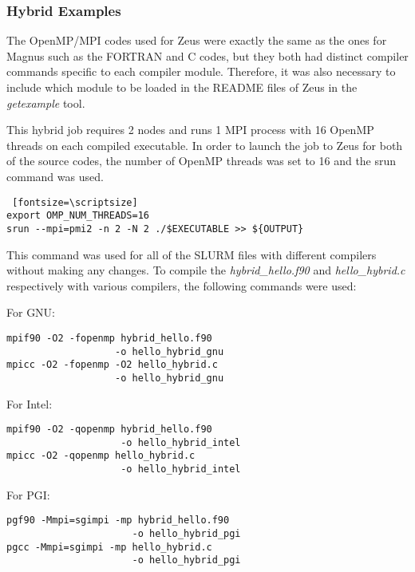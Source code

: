 \subsubsection{Hybrid Examples}

The OpenMP/MPI codes used for Zeus were exactly the same as the ones for Magnus such as the FORTRAN and C codes, but they both had distinct compiler 
commands specific to each compiler module. Therefore, it was also necessary to include which module to be loaded in the README files of Zeus in the 
\emph{getexample} tool.

This hybrid job requires 2 nodes and runs 1 MPI process with 16 OpenMP threads on each compiled executable. In order to launch the job to Zeus for both 
of the source codes, the number of OpenMP threads was set to 16 and the srun command was used.

\begin{tcolorbox}
\begin{Verbatim} [fontsize=\scriptsize]
export OMP_NUM_THREADS=16
srun --mpi=pmi2 -n 2 -N 2 ./$EXECUTABLE >> ${OUTPUT}
\end{Verbatim}
\end{tcolorbox}

This command was used for all of the SLURM files with different compilers without making any changes. To compile the \emph{hybrid\_hello.f90} and 
\emph{hello\_hybrid.c} respectively with various compilers, the following commands were used:

For GNU:

\begin{tcolorbox}
\begin{Verbatim}[fontsize=\scriptsize]
mpif90 -O2 -fopenmp hybrid_hello.f90 
                   -o hello_hybrid_gnu
mpicc -O2 -fopenmp -O2 hello_hybrid.c 
                   -o hello_hybrid_gnu
\end{Verbatim}
\end{tcolorbox}


For Intel:

\begin{tcolorbox}
\begin{Verbatim}[fontsize=\scriptsize]
mpif90 -O2 -qopenmp hybrid_hello.f90 
                    -o hello_hybrid_intel
mpicc -O2 -qopenmp hello_hybrid.c 
                    -o hello_hybrid_intel
\end{Verbatim}
\end{tcolorbox}

For PGI:

\begin{tcolorbox}
\begin{Verbatim}[fontsize=\scriptsize]
pgf90 -Mmpi=sgimpi -mp hybrid_hello.f90 
                      -o hello_hybrid_pgi
pgcc -Mmpi=sgimpi -mp hello_hybrid.c 
                      -o hello_hybrid_pgi
\end{Verbatim}
\end{tcolorbox}
